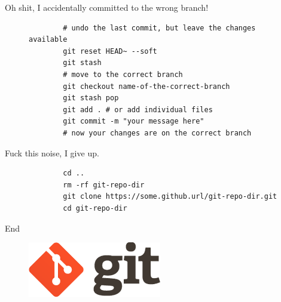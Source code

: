 \begin{frame}[fragile]{Oh shit, I accidentally committed to the wrong branch!}
    \begin{figure}
    \begin{lstlisting}
        # undo the last commit, but leave the changes available
        git reset HEAD~ --soft
        git stash
        # move to the correct branch
        git checkout name-of-the-correct-branch
        git stash pop
        git add . # or add individual files
        git commit -m "your message here"
        # now your changes are on the correct branch
        \end{lstlisting}
\end{figure}
\end{frame}

\begin{frame}[fragile]{Fuck this noise, I give up.}

    \begin{figure}
        \begin{lstlisting}
        cd ..
        rm -rf git-repo-dir
        git clone https://some.github.url/git-repo-dir.git
        cd git-repo-dir
        \end{lstlisting}
    \end{figure}
\end{frame}

\begin{frame}{End}

    \begin{figure}
    \centering
    \includegraphics[width=\textwidth]{img/git-logo.png}
    \end{figure}

\end{frame}
